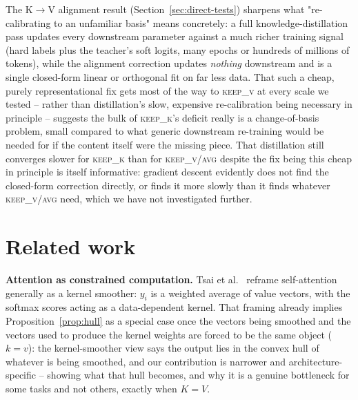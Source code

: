 \documentclass[11pt]{article}
\begin{document}
The K$\to$V alignment result (Section~\ref{sec:direct-tests}) sharpens what
"re-calibrating to an unfamiliar basis" means concretely: a full knowledge-distillation
pass updates every downstream parameter against a much richer training signal
(hard labels plus the teacher's soft logits, many epochs or hundreds of millions of
tokens), while the alignment correction updates \emph{nothing} downstream and is a
single closed-form linear or orthogonal fit on far less data. That such a cheap,
purely representational fix gets most of the way to \textsc{keep\_v} at every scale
we tested -- rather than distillation's slow, expensive re-calibration being
necessary in principle -- suggests the bulk of \textsc{keep\_k}'s deficit really is a
change-of-basis problem, small compared to what generic downstream re-training would
be needed for if the content itself were the missing piece. That distillation still
converges slower for \textsc{keep\_k} than for \textsc{keep\_v}/\textsc{avg} despite
the fix being this cheap in principle is itself informative: gradient descent
evidently does not find the closed-form correction directly, or finds it more slowly
than it finds whatever \textsc{keep\_v}/\textsc{avg} need, which we have not
investigated further.

\section{Related work}
\label{sec:related}

\textbf{Attention as constrained computation.} Tsai et al.~\cite{tsai2019kernel}
reframe self-attention generally as a kernel smoother: $y_i$ is a weighted average of
value vectors, with the softmax scores acting as a data-dependent kernel. That framing
already implies Proposition~\ref{prop:hull} as a special case once the vectors being
smoothed and the vectors used to produce the kernel weights are forced to be the same
object ($k=v$): the kernel-smoother view says the output lies in the convex hull of
whatever is being smoothed, and our contribution is narrower and
architecture-specific -- showing what that hull becomes, and why it is a genuine
bottleneck for some tasks and not others, exactly when $K=V$.
\end{document}
